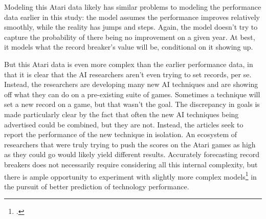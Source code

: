 \documentclass{article}
\begin{document}
Modeling this Atari data likely has similar problems to modeling the performance data earlier in this study: the model assumes the performance improves relatively smoothly, while the reality has jumps and steps. Again, the model doesn't try to capture the probability of there being no improvement on a given year. At best, it models what the record breaker's value will be, conditional on it showing up. 

But this Atari data is even more complex than the earlier performance data, in that it is clear that the AI researchers aren't even trying to set records, per se. Instead, the researchers are developing many new AI techniques and are showing off what they can do on a pre-existing suite of games. Sometimes a technique will set a new record on a game, but that wasn't the goal. The discrepancy in goals is made particularly clear by the fact that often the new AI techniques being advertised could be combined, but they are not. Instead, the articles seek to report the performance of the new technique in isolation. An ecosystem of researchers that were truly trying to push the scores on the Atari games as high as they could go would likely yield different results. Accurately forecasting record breakers does not necessarily require considering all this internal complexity, but there is ample opportunity to experiment with slightly more complex models\footcite{Berdahl2017} in the pursuit of better prediction of technology performance.



\end{document}
